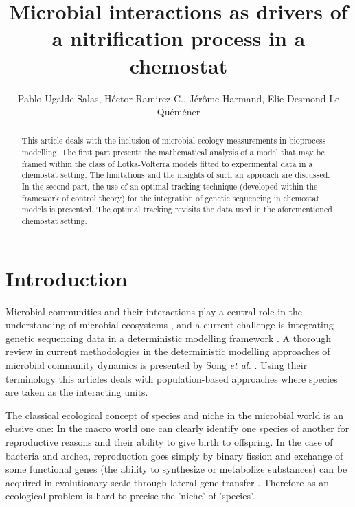 \documentclass[3p,times]{article}
\begin{document}
\title{Microbial interactions as drivers of a nitrification process in a chemostat}

\author{Pablo Ugalde-Salas, Héctor Ramirez C., Jérôme Harmand, Elie Desmond-Le Quéméner}
\date{}
\maketitle



\begin{abstract}
	This article deals with the inclusion of microbial ecology measurements in bioprocess modelling. The first part presents the mathematical analysis of a model that may be framed within the class of Lotka-Volterra models fitted to experimental data in a chemostat setting. The limitations and the insights of such an approach are discussed. In the second part,  the use of an optimal tracking technique (developed within the framework of control theory) for the integration of genetic sequencing in chemostat models is presented. The optimal tracking revisits the data used in the aforementioned chemostat setting. 
\end{abstract}



\section{Introduction}


Microbial communities and their interactions play a central role in the understanding of microbial ecosystems \cite{West2007}, and a current challenge is integrating genetic sequencing data in a deterministic modelling framework \cite{Widder2016,WADE201664}. A thorough review in current methodologies in the deterministic modelling approaches of microbial community dynamics is presented by Song \textit{et al.} \cite{Song2014}. Using their terminology this articles deals with population-based approaches where species are taken as the interacting units.

The classical ecological concept of species and niche in the microbial world is an elusive one: In the macro world one can clearly identify one species of another for reproductive reasons and their ability to give birth to offspring. In the case of bacteria and archea, reproduction goes simply by binary fission and exchange of some functional genes (the ability to synthesize or metabolize substances) can be acquired in evolutionary scale through lateral gene transfer \cite{Boucher2003}. Therefore as an ecological problem is hard to precise the 'niche' of 'species'.
\end{document}
